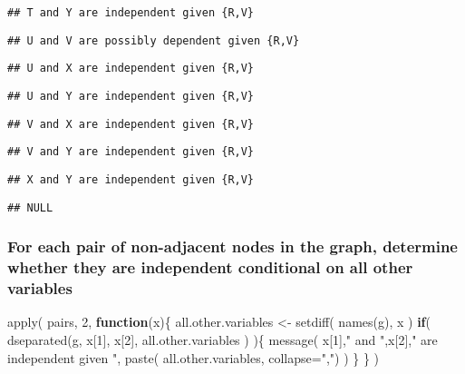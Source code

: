 \documentclass[
]{article}
\newenvironment{Shaded}{\begin{snugshade}}{\end{snugshade}}
\newcommand{\AttributeTok}[1]{\textcolor[rgb]{0.77,0.63,0.00}{#1}}
\newcommand{\ControlFlowTok}[1]{\textcolor[rgb]{0.13,0.29,0.53}{\textbf{#1}}}
\newcommand{\DecValTok}[1]{\textcolor[rgb]{0.00,0.00,0.81}{#1}}
\newcommand{\FunctionTok}[1]{\textcolor[rgb]{0.00,0.00,0.00}{#1}}
\newcommand{\NormalTok}[1]{#1}
\newcommand{\OtherTok}[1]{\textcolor[rgb]{0.56,0.35,0.01}{#1}}
\newcommand{\StringTok}[1]{\textcolor[rgb]{0.31,0.60,0.02}{#1}}
\begin{document}
\begin{verbatim}
## T and Y are independent given {R,V}
\end{verbatim}

\begin{verbatim}
## U and V are possibly dependent given {R,V}
\end{verbatim}

\begin{verbatim}
## U and X are independent given {R,V}
\end{verbatim}

\begin{verbatim}
## U and Y are independent given {R,V}
\end{verbatim}

\begin{verbatim}
## V and X are independent given {R,V}
\end{verbatim}

\begin{verbatim}
## V and Y are independent given {R,V}
\end{verbatim}

\begin{verbatim}
## X and Y are independent given {R,V}
\end{verbatim}

\begin{verbatim}
## NULL
\end{verbatim}

\hypertarget{for-each-pair-of-non-adjacent-nodes-in-the-graph-determine-whether-they-are-independent-conditional-on-all-other-variables}{%
\subsubsection{For each pair of non-adjacent nodes in the graph,
determine whether they are independent conditional on all other
variables}\label{for-each-pair-of-non-adjacent-nodes-in-the-graph-determine-whether-they-are-independent-conditional-on-all-other-variables}}

\begin{Shaded}
\begin{Highlighting}[]
\FunctionTok{apply}\NormalTok{( pairs, }\DecValTok{2}\NormalTok{, }\ControlFlowTok{function}\NormalTok{(x)\{}
\NormalTok{  all.other.variables }\OtherTok{\textless{}{-}} \FunctionTok{setdiff}\NormalTok{( }\FunctionTok{names}\NormalTok{(g), x )}
  \ControlFlowTok{if}\NormalTok{( }\FunctionTok{dseparated}\NormalTok{(g, x[}\DecValTok{1}\NormalTok{], x[}\DecValTok{2}\NormalTok{], all.other.variables ) )\{}
    \FunctionTok{message}\NormalTok{( x[}\DecValTok{1}\NormalTok{],}\StringTok{" and "}\NormalTok{,x[}\DecValTok{2}\NormalTok{],}\StringTok{" are independent given "}\NormalTok{, }
             \FunctionTok{paste}\NormalTok{( all.other.variables, }\AttributeTok{collapse=}\StringTok{","}\NormalTok{) )}
\NormalTok{  \}}
\NormalTok{\} )}
\end{Highlighting}
\end{Shaded}
\end{document}
